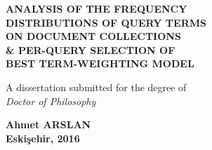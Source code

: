



\makeatother

\thispagestyle{empty}



\begin{spacing}{1.0}
\vspace*{12.3cm}
\begin{center}

{\footnotesize

\textbf{ANALYSIS OF THE FREQUENCY \\ DISTRIBUTIONS OF QUERY TERMS \\ ON DOCUMENT COLLECTIONS \\ \& PER-QUERY SELECTION OF \\ BEST TERM-WEIGHTING MODEL}


A dissertation submitted for the degree of \\ \emph{Doctor of Philosophy}

\vspace{0.2cm}

\textbf{Ahmet ARSLAN \\ Eski\c{s}ehir, 2016}

}
\end{center}
\end{spacing} 

 